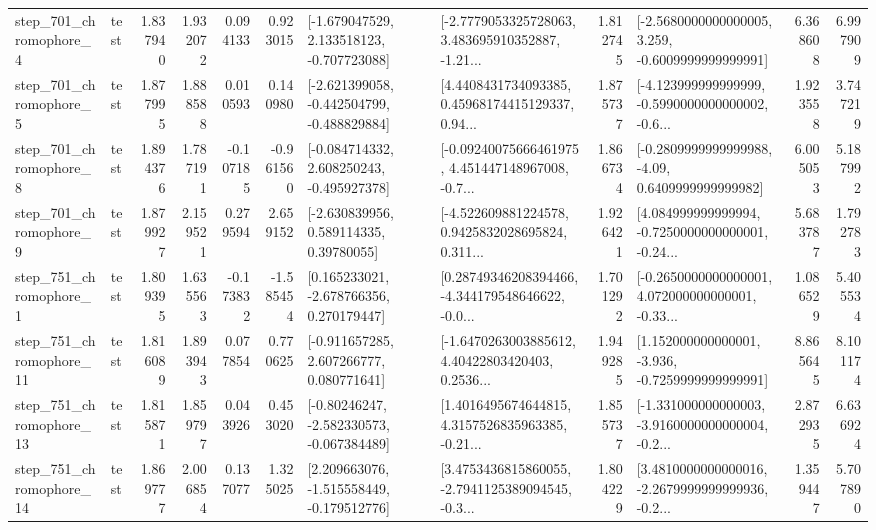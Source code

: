\begin{tabular}{llrrrrllrlrr}
   step\_701\_chromophore\_4 &      test &      1.837940 &    1.932072 &      0.094133 &  0.923015 &   [-1.679047529, 2.133518123, -0.707723088] &  [-2.7779053325728063, 3.483695910352887, -1.21... &       1.812745 &  [-2.5680000000000005, 3.259, -0.6009999999999991] &            6.368608 &          6.997909 \\
   step\_701\_chromophore\_5 &      test &      1.877995 &    1.888588 &      0.010593 &  0.140980 &  [-2.621399058, -0.442504799, -0.488829884] &  [4.4408431734093385, 0.45968174415129337, 0.94... &       1.875737 &  [-4.123999999999999, -0.5990000000000002, -0.6... &            1.923558 &          3.747219 \\
   step\_701\_chromophore\_8 &      test &      1.894376 &    1.787191 &     -0.107185 & -0.961560 &   [-0.084714332, 2.608250243, -0.495927378] &  [-0.09240075666461975, 4.451447148967008, -0.7... &       1.866734 &   [-0.2809999999999988, -4.09, 0.6409999999999982] &            6.005053 &          5.187992 \\
   step\_701\_chromophore\_9 &      test &      1.879927 &    2.159521 &      0.279594 &  2.659152 &     [-2.630839956, 0.589114335, 0.39780055] &  [-4.522609881224578, 0.9425832028695824, 0.311... &       1.926421 &  [4.084999999999994, -0.7250000000000001, -0.24... &            5.683787 &          1.792783 \\
   step\_751\_chromophore\_1 &      test &      1.809395 &    1.635563 &     -0.173832 & -1.585454 &    [0.165233021, -2.678766356, 0.270179447] &  [0.28749346208394466, -4.344179548646622, -0.0... &       1.701292 &  [-0.2650000000000001, 4.072000000000001, -0.33... &            1.086529 &          5.405534 \\
  step\_751\_chromophore\_11 &      test &      1.816089 &    1.893943 &      0.077854 &  0.770625 &    [-0.911657285, 2.607266777, 0.080771641] &  [-1.6470263003885612, 4.40422803420403, 0.2536... &       1.949285 &   [1.152000000000001, -3.936, -0.7259999999999991] &            8.865645 &          8.101174 \\
  step\_751\_chromophore\_13 &      test &      1.815871 &    1.859797 &      0.043926 &  0.453020 &   [-0.80246247, -2.582330573, -0.067384489] &  [1.4016495674644815, 4.3157526835963385, -0.21... &       1.855737 &  [-1.331000000000003, -3.9160000000000004, -0.2... &            2.872935 &          6.636924 \\
  step\_751\_chromophore\_14 &      test &      1.869777 &    2.006854 &      0.137077 &  1.325025 &   [2.209663076, -1.515558449, -0.179512776] &  [3.4753436815860055, -2.7941125389094545, -0.3... &       1.804229 &  [3.4810000000000016, -2.2679999999999936, -0.2... &            1.359447 &          5.707890 \\

\end{tabular}
